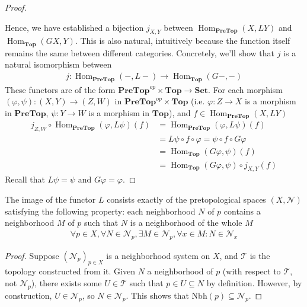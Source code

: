 \documentclass{treatise}
\begin{document}
\begin{shaded}
\begin{proof}
\begin{enumerate}
\end{enumerate}
Hence, we have established a bijection $j_{X, Y}$ between $\operatorname{Hom}_{\mathbf{PreTop}}(X, LY)$ and $\operatorname{Hom}_{\mathbf{Top}}(GX, Y)$. This is also natural, intuitively because the function itself remains the same between different categories. Concretely, we'll show that $j$ is a natural isomorphism between
\begin{align*}
    j: \operatorname{Hom}_{\mathbf{PreTop}}(-, L -) \to \operatorname{Hom}_{\mathbf{Top}}(G -, -)
\end{align*}
These functors are of the form $\mathbf{PreTop}^{op} \times \mathbf{Top} \to \mathbf{Set}$. For each morphism $(\varphi, \psi): (X, Y) \to (Z, W)$ in $\mathbf{PreTop}^{op} \times \mathbf{Top}$ (i.e. $\varphi: Z \to X$ is a morphism in $\mathbf{PreTop}$, $\psi: Y \to W$ is a morphism in $\mathbf{Top}$), and $f \in \operatorname{Hom}_{\mathbf{PreTop}}(X, LY)$
\begin{align*}
    j_{Z, W} \circ \operatorname{Hom}_{\mathbf{PreTop}}(\varphi, L\psi) (f) & = \operatorname{Hom}_{\mathbf{PreTop}}(\varphi, L\psi) (f)
    \\
    & = L\psi \circ f \circ \varphi = \psi \circ f \circ G\varphi
    \\
    & = \operatorname{Hom}_{\mathbf{Top}}(G\varphi, \psi) (f)
    \\
    & = \operatorname{Hom}_{\mathbf{Top}}(G\varphi, \psi) \circ j_{X, Y} (f)
\end{align*}
Recall that $L\psi = \psi$ and $G\varphi = \varphi$.
\end{proof}
\begin{theorem} \label{topo-neigh-sys}
The image of the functor $L$ consists exactly of the pretopological spaces $(X, \mathcal{N})$ satisfying the following property: each neighborhood $N$ of $p$ contains a neighborhood $M$ of $p$ such that $N$ is a neighborhood of the whole $M$
\begin{align*}
    \forall p \in X, \forall N \in \mathcal{N}_p, \exists M \in \mathcal{N}_p, \forall x \in M: N \in \mathcal{N}_x
\end{align*}
\end{theorem}
\begin{proof}
Suppose $(\mathcal{N}_p)_{p \in X}$ is a neighborhood system on $X$, and $\mathcal{T}$ is the topology constructed from it. Given $N$ a neighborhood of $p$ (with respect to $\mathcal{T}$, not $\mathcal{N}_p$), there exists some $U \in \mathcal{T}$ such that $p \in U \subseteq N$ by definition. However, by construction, $U \in \mathcal{N}_p$, so $N \in \mathcal{N}_p$. This shows that $\mathrm{Nbh}(p) \subseteq \mathcal{N}_p$.

\end{proof}
\end{shaded}
\end{document}
